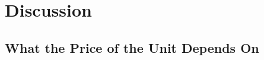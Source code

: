 %
%
%
%
%

\section{Discussion}
\label{sec:discussion}

\subsection{What the Price of the Unit Depends On}
\label{sec:discussion:unit}

